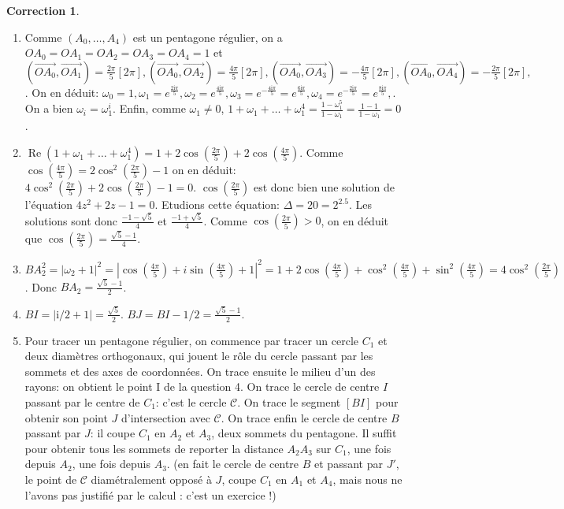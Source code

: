 \documentclass[11pt,a4paper]{article}
\theoremstyle{definition}
\newtheorem{cor}{Correction}
\newcommand{\correction}{\begin{cor}} \newcommand{\fincorrection}{\end{cor}}
\newcommand{\ii}{\mathrm{i}}
\begin{document}
\correction
\begin{enumerate}
\item
Comme $(A_{0},\ldots,A_{4})$ est un pentagone r\'egulier, on a
$OA_{0}=OA_{1}=OA_{2}=OA_{3}=OA_{4}=1$ et $
  (\overrightarrow{OA_{0}},\overrightarrow{OA_{1}})=\frac{2\pi}{5}[2\pi],
  (\overrightarrow{OA_{0}},\overrightarrow{OA_{2}})=\frac{4\pi}{5}[2\pi],
  (\overrightarrow{OA_{0}},\overrightarrow{OA_{3}})=-\frac{4\pi}{5}[2\pi],
  (\overrightarrow{OA_{0}},\overrightarrow{OA_{4}})=-\frac{2\pi}{5}[2\pi],
 $.
On en d\'eduit:
 $
  \omega_{0}=1,
  \omega_{1}=e^{\frac{2\ii\pi}{5}},
  \omega_{2}=e^{\frac{4\ii\pi}{5}},
  \omega_{3}=e^{-\frac{4\ii\pi}{5}}=e^{\frac{6\ii\pi}{5}},
  \omega_{4}=e^{-\frac{2\ii\pi}{5}}=e^{\frac{8\ii\pi}{5}},
 $.
On a bien $\omega_{i}=\omega_{1}^i$. Enfin, comme
$\omega_{1}\neq0$, $1+\omega_{1}+\ldots+\omega_{1}^4=
\frac{1-\omega_{1}^5}{1-\omega_{1}}=\frac{1-1}{1-\omega_{1}}=0$.

\item $\mathop{\mathrm{Re}}\nolimits(1+\omega_{1}+\ldots+\omega_{1}^4)=
1+2\cos(\frac{2\pi}{5})+2\cos(\frac{4\pi}{5})$. Comme
$\cos(\frac{4\pi}{5})=2\cos^2(\frac{2\pi}{5})-1$ on en d\'eduit:
$4\cos^2(\frac{2\pi}{5})+2\cos(\frac{2\pi}{5})-1=0$.
$\cos(\frac{2\pi}{5})$ est donc bien une solution de l'\'equation
$4z^2+2z-1=0$. Etudions cette \'equation: $\Delta=20=2^2.5$. Les
solutions sont donc $\frac{-1-\sqrt{5}}{4}$ et
$\frac{-1+\sqrt{5}}{4}$. Comme $\cos(\frac{2\pi}{5})>0$, on en
d\'eduit que $\cos(\frac{2\pi}{5})=\frac{\sqrt{5}-1}{4}$.

\item
 $
  BA_{2}^2=|\omega_{2}+1|^2
          =|\cos(\frac{4\pi}{5})+i\sin(\frac{4\pi}{5})+1|^2
          =1+2\cos(\frac{4\pi}{5})+\cos^2(\frac{4\pi}{5})+\sin^2(\frac{4\pi}{5})
          =4\cos^2(\frac{2\pi}{5})
  $. Donc $BA_{2}=\frac{\sqrt{5}-1}{2}$.

\item
$BI=|\ii/2+1|=\frac{\sqrt{5}}{2}$. $BJ=BI-1/2=\frac{\sqrt{5}-1}{2}$.

\item
Pour tracer un pentagone r\'egulier, on commence par tracer un
cercle $C_{1}$ et deux diam\`etres orthogonaux, qui jouent le r\^ole
du cercle passant par les sommets et des axes de coordonn\'ees. On
trace ensuite le milieu d'un des rayons: on obtient le point I de
la question 4. On trace le  cercle de centre $I$ passant par le
centre de $C_{1}$: c'est le cercle $\mathcal{C}$. On trace le
segment $[BI]$ pour obtenir son point $J$ d'intersection avec
$\mathcal{C}$. On trace enfin le cercle de centre $B$ passant par
$J$: il coupe $C_{1}$ en $A_{2}$ et $A_{3}$, deux sommets du
pentagone. Il suffit pour obtenir tous les sommets de reporter la
distance $A_{2}A_{3}$ sur $C_{1}$, une fois depuis $A_{2}$, une
fois depuis $A_{3}$. (en fait le cercle de centre $B$ et passant
par $J'$, le point de $\mathcal{C}$ diam\'etralement oppos\'e \`a
$J$, coupe $C_{1}$ en $A_{1}$ et $A_{4}$, mais nous ne l'avons pas
justifi\'e par le calcul : c'est un exercice !)
\end{enumerate}
\fincorrection
\finexercice
\end{document}
